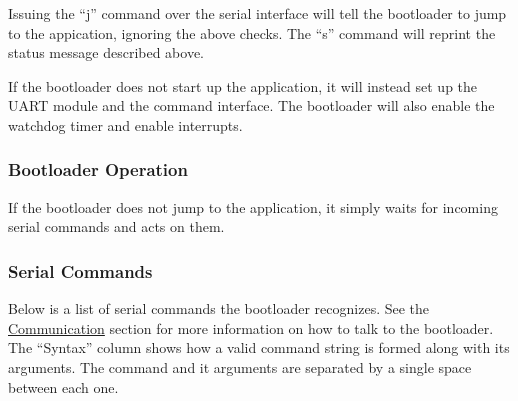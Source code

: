 \documentclass{article}
\begin{document}
Issuing the ``j'' command over the serial interface will tell the bootloader to jump to the
appication, ignoring the above checks.  The ``s'' command will reprint the status message described
above.

If the bootloader does not start up the application, it will instead set up the UART module and the
command interface.  The bootloader will also enable the watchdog timer and enable interrupts.

\subsubsection{Bootloader Operation} \label{sssec:FWBootOperation}
If the bootloader does not jump to the application, it simply waits for incoming serial commands and
acts on them.

\subsubsection{Serial Commands} \label{sssec:FWBootCommands}
Below is a list of serial commands the bootloader recognizes.  See the
\hyperref[ssec:FWComm]{Communication} section for more information on how to talk to the
bootloader. The ``Syntax'' column shows how a valid command string is formed along with its
arguments. The command and it arguments are separated by a single space between each one.
\end{document}
